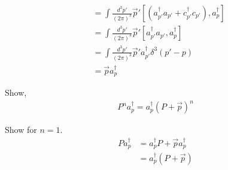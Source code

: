 \documentclass[working, oneside]{../../Preambles/tuftebook}
\begin{document}
\begin{solution}
\begin{align*}
[P, a_p^\dagger] &= \int \frac{d^3p'}{(2\pi)^3} \vec{p}' [(a_{p'}^\dagger a_{p'} + c_{p'}^\dagger c_{p'}), a_p^\dagger] \\
&= \int \frac{d^3p'}{(2\pi)^3} \vec{p}' [a_{p'}^\dagger a_{p'}, a_p^\dagger] \\
&= \int \frac{d^3p'}{(2\pi)^3} \vec{p}' a_{p'}^\dagger \delta^3(p' - p) \\
&= \vec{p} a_p^\dagger
\end{align*}

Show,
\begin{align*}
P^n a_p^\dagger = a_p^\dagger (P + \vec{p})^n
\end{align*}

Show for $n = 1$.
\begin{align*}
P a_p^\dagger &= a_p^\dagger P + \vec{p} a_p^\dagger \\
&= a_p^\dagger (P + \vec{p})
\end{align*}


\end{solution}
\end{document}
